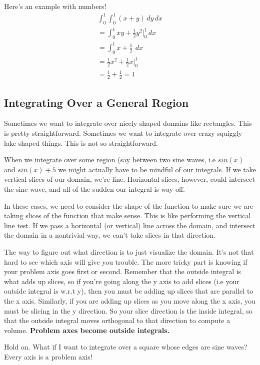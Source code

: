 \documentclass[12pt, letterpaper]{article}
\begin{document}
Here's an example with numbers!
\begin{gather*}
    \int_0^1 \int_0^1 (x+y) \,dy\,dx\\
    = \int_0^1 xy + \frac{1}{2}y^2 \biggr \rvert_0^1 \,dx\\
    = \int_0^1 x + \frac{1}{2}\ \,dx\\
    = \frac{1}{2}x^2 + \frac{1}{2}x \biggr \rvert_0^1\\
    = \frac{1}{2} + \frac{1}{2} = 1
\end{gather*}

\subsection{Integrating Over a General Region}
Sometimes we want to integrate over nicely shaped domains like rectangles.
This is pretty straightforward.
Sometimes we want to integrate over crazy squiggly lake shaped things.
This is not so straightforward.

When we integrate over some region (say between two sine waves, i.e $sin(x)$ and $sin(x) + 5$ we might actually have to be mindful of our integrals.
If we take vertical slices of our domain, we're fine.
Horizontal slices, however, could intersect the sine wave, and all of the sudden our integral is way off.

In these cases, we need to consider the shape of the function to make sure we are taking slices of the function that make sense.
This is like performing the vertical line test.
If we pass a horizontal (or vertical) line across the domain, and intersect the domain in a nontrivial way, we can't take slices in that direction.

The way to figure out what direction is to just visualize the domain. 
It's not that hard to see which axis will give you trouble. 
The more tricky part is knowing if your problem axis goes first or second.
Remember that the outside integral is what adds up slices, so if you're going along the y axis to add slices (i.e your outside integral is w.r.t y), then you must be adding up slices that are parallel to the x axis.
Similarly, if you are adding up slices as you move along the x axis, you must be slicing in the y direction.
So your slice direction is the inside integral, so that the outside integral moves orthogonal to that direction to compute a volume.
\textbf{Problem axes become outside integrals.}

Hold on. What if I want to integrate over a square whose edges are sine waves?
Every axis is a problem axis!
\end{document}
